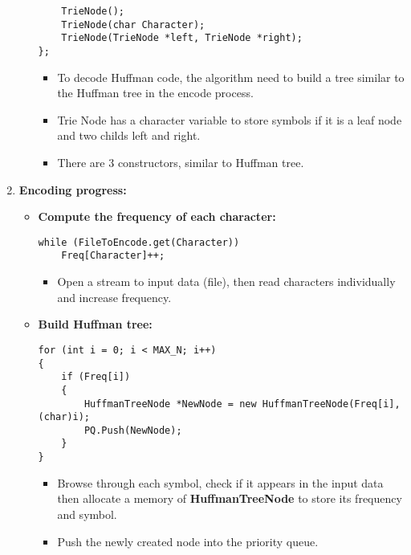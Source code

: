 \begin{enumerate}[label=\textbf{\Alph*.}]
\begin{itemize}
\begin{verbatim}
    TrieNode();
    TrieNode(char Character);
    TrieNode(TrieNode *left, TrieNode *right);
};
\end{verbatim}
        \begin{itemize}
            \item To decode Huffman code, the algorithm need to build a tree similar to the Huffman tree in the encode process.
            \item Trie Node has a character variable to store symbols if it is a leaf node and two childs left and right.
            \item There are 3 constructors, similar to Huffman tree.
        \end{itemize}
    \end{itemize}
    \item \textbf{Encoding progress:}
    \begin{itemize}
        \item \textbf{Compute the frequency of each character:}
\begin{verbatim}
while (FileToEncode.get(Character))
    Freq[Character]++;
\end{verbatim}
        \begin{itemize}
            \item Open a stream to input data (file), then read characters individually and increase frequency. 
        \end{itemize}
        \item \textbf{Build Huffman tree:}
\begin{verbatim}
for (int i = 0; i < MAX_N; i++)
{
    if (Freq[i]) 
    {
        HuffmanTreeNode *NewNode = new HuffmanTreeNode(Freq[i], (char)i);
        PQ.Push(NewNode);
    }
}
\end{verbatim}
        \begin{itemize}
            \item Browse through each symbol, check if it appears in the input data then allocate a memory of \textbf{HuffmanTreeNode} to store its frequency and symbol.
            \item Push the newly created node into the priority queue.
\begin{verbatim}

\end{verbatim}
\end{itemize}
\end{itemize}
\end{enumerate}

